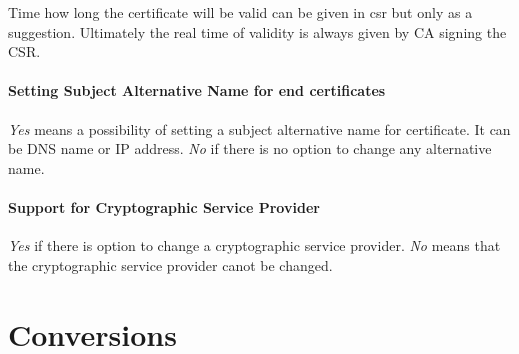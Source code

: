 \documentclass[10pt, a4paper]{report}
\begin{document}
Time how long the certificate will be valid can be given in csr but only as a suggestion. Ultimately the real time of
validity is always given by CA signing the CSR.


\paragraph{Setting Subject Alternative Name for end certificates}

\textit{Yes} means a  possibility of setting a subject alternative name for certificate. It can be DNS name or IP address. \textit{No} if there is no option to change any alternative name.

\paragraph{Support for Cryptographic Service Provider}
\textit{Yes} if there is option to change a cryptographic service provider. \textit{No} means that the cryptographic service provider canot be changed.

\newpage

\section{Conversions}
\end{document}
